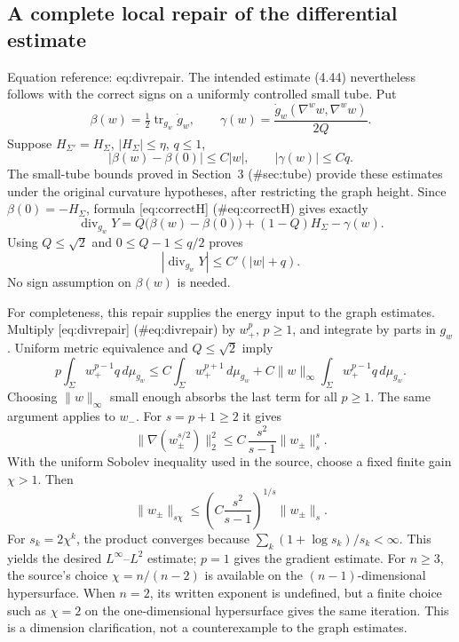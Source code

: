 \documentclass[10pt]{article}
\begin{document}
\subsection*{A complete local repair of the differential estimate}
Equation reference: eq:divrepair. The intended estimate (4.44) nevertheless follows with the correct signs on a uniformly controlled small tube. Put \[\beta(w)=\tfrac12\operatorname{tr}_{g_w}\dot g_w,\qquad
 \gamma(w)=\frac{\dot g_w(\nabla^w w,\nabla^w w)}{2Q}.\] Suppose \(H_{\Sigma'}=H_\Sigma\), \(|H_\Sigma|\leq\eta\), \(q\leq1\), \[|\beta(w)-\beta(0)|\leq C|w|,\qquad
 |\gamma(w)|\leq Cq .\] The small-tube bounds proved in Section 3 (\#sec:tube) provide these estimates under the original curvature hypotheses, after restricting the graph height. Since \(\beta(0)=-H_\Sigma\), formula [eq:correctH] (\#eq:correctH) gives exactly \[\operatorname{div}_{g_w}Y
 =Q\bigl(\beta(w)-\beta(0)\bigr)+(1-Q)H_\Sigma-\gamma(w).\] Using \(Q\leq\sqrt2\) and \(0\leq Q-1\leq q/2\) proves \[
 |\operatorname{div}_{g_w}Y|\leq C'(|w|+q).\] No sign assumption on \(\beta(w)\) is needed.\par
For completeness, this repair supplies the energy input to the graph estimates. Multiply [eq:divrepair] (\#eq:divrepair) by \(w_+^p\), \(p\geq1\), and integrate by parts in \(g_w\). Uniform metric equivalence and \(Q\leq\sqrt2\) imply \[p\int_\Sigma w_+^{p-1}q\,d\mu_{g_w}
 \leq C\int_\Sigma w_+^{p+1}\,d\mu_{g_w}
     +C\|w\|_\infty\int_\Sigma w_+^{p-1}q\,d\mu_{g_w}.\] Choosing \(\|w\|_\infty\) small enough absorbs the last term for all \(p\geq1\). The same argument applies to \(w_-\). For \(s=p+1\geq2\) it gives \[\|\nabla(w_\pm^{s/2})\|_2^2
 \leq C\,\frac{s^2}{s-1}\|w_\pm\|_s^s .\] With the uniform Sobolev inequality used in the source, choose a fixed finite gain \(\chi>1\). Then \[\|w_\pm\|_{s\chi}
 \leq \left(C\frac{s^2}{s-1}\right)^{1/s}\|w_\pm\|_s .\] For \(s_k=2\chi^k\), the product converges because \(\sum_k(1+\log s_k)/s_k<\infty\). This yields the desired \(L^\infty\)–\(L^2\) estimate; \(p=1\) gives the gradient estimate. For \(n\geq3\), the source’s choice \(\chi=n/(n-2)\) is available on the \((n-1)\)-dimensional hypersurface. When \(n=2\), its written exponent is undefined, but a finite choice such as \(\chi=2\) on the one-dimensional hypersurface gives the same iteration. This is a dimension clarification, not a counterexample to the graph estimates.\par
\end{document}
